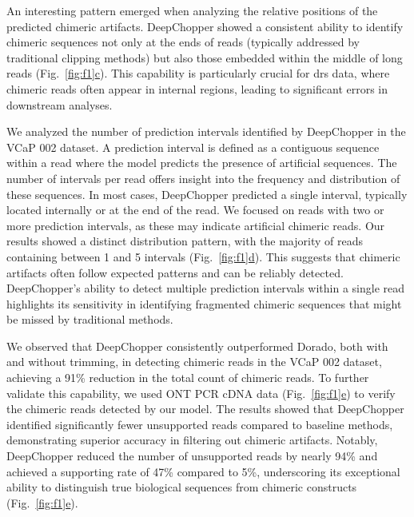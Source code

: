 \documentclass[pdflatex, sn-mathphys-num, lineno]{sn-jnl}%
\newcommand{\figref}[2]{Fig.~\hyperref[#1]{\ref*{#1}#2}}
\theoremstyle{thmstyleone}%
\theoremstyle{thmstyletwo}%
\theoremstyle{thmstylethree}%
\begin{document}

An interesting pattern emerged when analyzing the relative positions of the predicted chimeric artifacts.
DeepChopper showed a consistent ability to identify chimeric sequences not only at the ends of reads (typically addressed by traditional clipping methods) but also those embedded within the middle of long reads (\figref{fig:f1}{c}).
This capability is particularly crucial for \gls{drs} data, where chimeric reads often appear in internal regions, leading to significant errors in downstream analyses.


We analyzed the number of prediction intervals identified by DeepChopper in the VCaP 002 dataset.
A prediction interval is defined as a contiguous sequence within a read where the model predicts the presence of artificial sequences.
The number of intervals per read offers insight into the frequency and distribution of these sequences.
In most cases, DeepChopper predicted a single interval, typically located internally or at the end of the read.
We focused on reads with two or more prediction intervals, as these may indicate artificial chimeric reads.
Our results showed a distinct distribution pattern, with the majority of reads containing between 1 and 5 intervals (\figref{fig:f1}{d}).
This suggests that chimeric artifacts often follow expected patterns and can be reliably detected.
DeepChopper's ability to detect multiple prediction intervals within a single read highlights its sensitivity in identifying fragmented chimeric sequences that might be missed by traditional methods.


We observed that DeepChopper consistently outperformed Dorado, both with and without trimming, in detecting chimeric reads in the VCaP 002 dataset, achieving a 91\% reduction in the total count of chimeric reads.
To further validate this capability, we used ONT PCR cDNA data (\figref{fig:f1}{e}) to verify the chimeric reads detected by our model.
The results showed that DeepChopper identified significantly fewer unsupported reads compared to baseline methods, demonstrating superior accuracy in filtering out chimeric artifacts. Notably, DeepChopper reduced the number of unsupported reads by nearly 94\% and achieved a supporting rate of 47\% compared to 5\%, underscoring its exceptional ability to distinguish true biological sequences from chimeric constructs (\figref{fig:f1}{e}).
\end{document}
